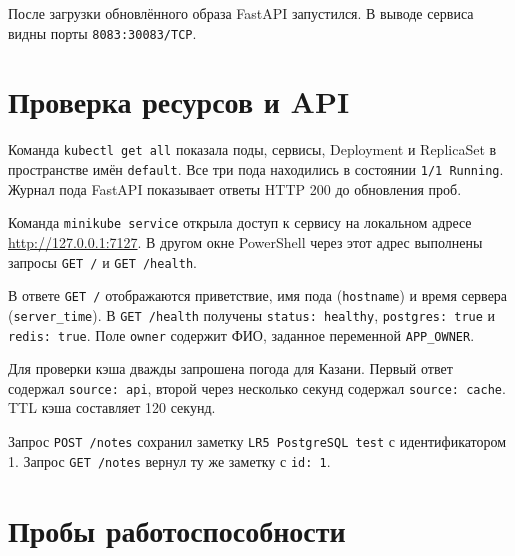 
После загрузки обновлённого образа FastAPI запустился.
В выводе сервиса видны порты \texttt{8083:30083/TCP}.


\clearpage
\section{Проверка ресурсов и API}

Команда \texttt{kubectl get all} показала поды, сервисы, Deployment
и ReplicaSet в пространстве имён \texttt{default}.
Все три пода находились в состоянии \texttt{1/1 Running}.
Журнал пода FastAPI показывает ответы HTTP 200 до обновления проб.


Команда \texttt{minikube service} открыла доступ к сервису
на локальном адресе \url{http://127.0.0.1:7127}.
В другом окне PowerShell через этот адрес выполнены запросы
\texttt{GET /} и \texttt{GET /health}.


В ответе \texttt{GET /} отображаются приветствие, имя пода
(\texttt{hostname}) и время сервера (\texttt{server\_time}).
В \texttt{GET /health} получены \texttt{status: healthy},
\texttt{postgres: true} и \texttt{redis: true}. Поле \texttt{owner}
содержит ФИО, заданное переменной \texttt{APP\_OWNER}.

Для проверки кэша дважды запрошена погода для Казани.
Первый ответ содержал \texttt{source: api}, второй через несколько
секунд содержал \texttt{source: cache}. TTL кэша составляет 120 секунд.


Запрос \texttt{POST /notes} сохранил заметку
\texttt{LR5 PostgreSQL test} с идентификатором 1.
Запрос \texttt{GET /notes} вернул ту же заметку с \texttt{id: 1}.


\clearpage
\section{Пробы работоспособности}

